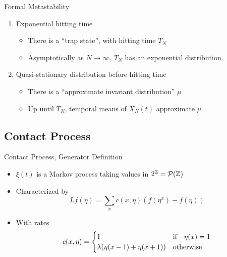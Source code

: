 \documentclass{beamer}
\begin{document}
\begin{frame}{Formal Metastability}
  \begin{enumerate}
    \item Exponential hitting time
    \begin{itemize}
      \item There is a ``trap state'', with hitting time $T_{N}$
      \item Asymptotically as $N \to \infty$, $T_{N}$ has an exponential distribution.
    \end{itemize}
    \pause
    \item Quasi-stationary distribution before hitting time
    \begin{itemize}
      \item There is a ``approximate invariant distribution'' $\mu$
      \item Up until $T_{N}$, temporal means of $X_{N}(t)$ approximate $\mu$
    \end{itemize}
  \end{enumerate}
\end{frame}

\subsection{Contact Process}

\begin{frame}{Contact Process, Generator Definition}
  \begin{itemize}
    \item $\xi(t)$ is a Markov process taking values in $2^{\mathbb{Z}} = \mathcal{P}(\mathbb{Z})$
    \item Characterized by
      \begin{equation}
        \label{eq:definition_contact_proc}
        Lf(\eta) = \sum_{x} c(x,\eta)(f(\eta^{x}) - f(\eta))
      \end{equation}
    \item With rates
      \begin{equation}
        \label{eq:contact_proc_rates}
        c(x,\eta) = \begin{cases}
          1 & \qif* \eta(x) = 1 \\
          \lambda(\eta(x-1) + \eta(x+1)) & \qotherwise*
        \end{cases}
      \end{equation}
  \end{itemize}
\end{frame}
\end{document}
